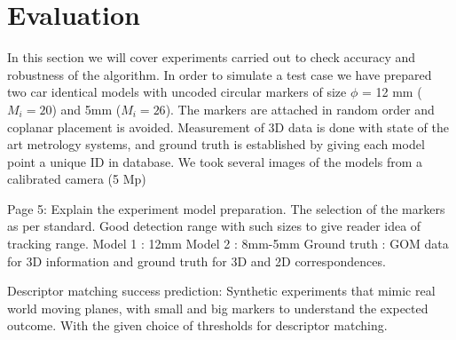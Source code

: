 \documentclass{bmvc2k}
\begin{document}


\section{Evaluation}
In this section we will cover experiments carried out to check accuracy and robustness of the algorithm. In order to simulate a test case we have prepared two car identical models with uncoded circular markers of size $ \phi $ = 12 mm ($ M_i = 20 $) and 5mm ($ M_i  = 26$). The markers are attached in random order and coplanar placement is avoided.  
Measurement of 3D data is done with state of the art metrology systems, and ground truth is established by giving each model point a unique ID in database. We took several images of the models from a calibrated camera (5 Mp)

Page 5: 
Explain the experiment model preparation. The selection of the markers as per standard. Good detection range with such sizes to give reader idea of tracking range. 
Model 1 : 12mm 
Model 2 : 8mm-5mm 
Ground truth : GOM data for 3D information and ground truth for 3D and 2D correspondences. 

Descriptor matching success prediction: Synthetic experiments that mimic real world moving planes, with small and big markers to understand the expected outcome. With the given choice of thresholds for descriptor matching. 

\end{document}
